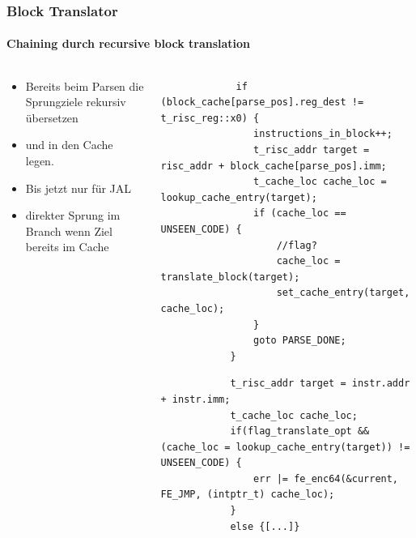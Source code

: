 \documentclass[german]{tum-presentation}
\begin{document}
\begin{frame}[fragile]
	\frametitle{Block Translator}
	\framesubtitle{Chaining durch recursive block translation}
	
	\pause
	\begin{columns}
		\begin{column}{0.5\textwidth}
			\vspace{0.25cm}
			\begin{itemize}
				\item Bereits beim Parsen die Sprungziele rekursiv übersetzen
				\item und in den Cache legen.
				\item Bis jetzt nur für JAL
				
				\vspace{1cm}
				
				\item direkter Sprung im Branch wenn Ziel bereits im Cache
			\end{itemize}
		\end{column}
		
		\begin{column}{0.5\textwidth}
			\begin{lstlisting}
			 if (block_cache[parse_pos].reg_dest != t_risc_reg::x0) {
			 	instructions_in_block++;
				t_risc_addr target = risc_addr + block_cache[parse_pos].imm;
				t_cache_loc cache_loc = lookup_cache_entry(target);
				if (cache_loc == UNSEEN_CODE) {
					//flag?
					cache_loc = translate_block(target);
					set_cache_entry(target, cache_loc);
				}
				goto PARSE_DONE;
			}
			\end{lstlisting}
			
			\vspace{1cm}
			
			\begin{lstlisting}
			t_risc_addr target = instr.addr + instr.imm;
			t_cache_loc cache_loc;
			if(flag_translate_opt && (cache_loc = lookup_cache_entry(target)) != UNSEEN_CODE) {
				err |= fe_enc64(&current, FE_JMP, (intptr_t) cache_loc);
			}
			else {[...]}
			\end{lstlisting}
		\end{column}
	\end{columns}
	
\end{frame}
\end{document}
